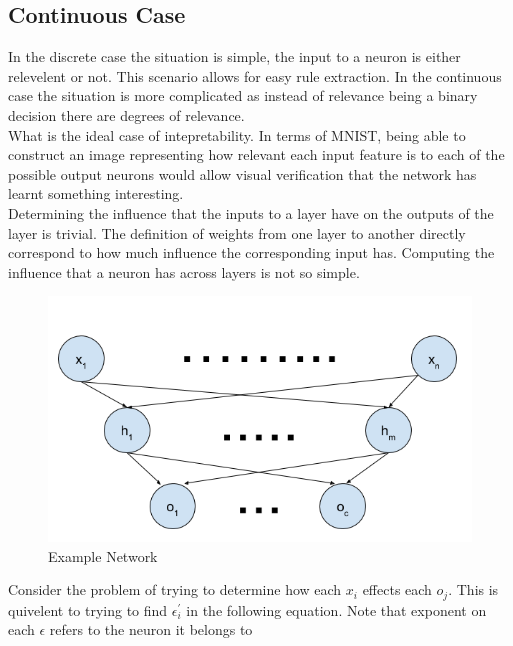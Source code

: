 \subsection{Continuous Case}

In the discrete case the situation is simple, the input to a neuron is either relevelent or not. This scenario allows for easy rule extraction. In the continuous case the situation is more complicated as instead of relevance being a binary decision there are degrees of relevance.\\

What is the ideal case of intepretability. In terms of MNIST, being able to construct an image representing how relevant each input feature is to each of the possible output neurons would allow visual verification that the network has learnt something interesting.\\

Determining the influence that the inputs to a layer have on the outputs of the layer is trivial. The definition of weights from one layer to another directly correspond to how much influence the corresponding input has. Computing the influence that a neuron has across layers is not so simple.

\begin{figure}[H]
	\centering
	\begin{minipage}[b]{0.5\textwidth}
		\includegraphics[width=\textwidth]{NetworkExample.png}
		\caption{Example Network}
		\label{fig:network-example}
	\end{minipage}
	\hfill
\end{figure}

Consider the problem of trying to determine how each $x_i$ effects each $o_j$. This is quivelent to trying to find $\epsilon^{'}_i$ in the following equation. Note that exponent on each $\epsilon$ refers to the neuron it belongs to

